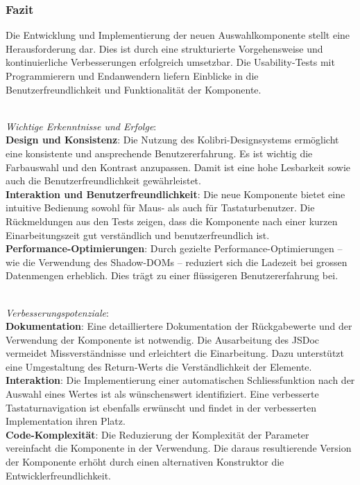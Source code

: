 % 


\subsubsection{Fazit}
\label{sec:userTestsSummery}

Die Entwicklung und Implementierung der neuen Auswahlkomponente stellt eine Herausforderung dar. 
Dies ist durch eine strukturierte Vorgehensweise und kontinuierliche Verbesserungen erfolgreich umsetzbar. 
Die Usability-Tests mit Programmierern und Endanwendern liefern Einblicke in die Benutzerfreundlichkeit und Funktionalität der Komponente. 

 \\
\noindent
\emph{Wichtige Erkenntnisse und Erfolge}: 
\\
\textbf{Design und Konsistenz}: 
Die Nutzung des Kolibri-Designsystems ermöglicht eine konsistente und ansprechende Benutzererfahrung. 
Es ist wichtig die Farbauswahl und den Kontrast anzupassen. 
Damit ist eine hohe Lesbarkeit sowie auch die Benutzerfreundlichkeit gewährleistet.
\\
\textbf{Interaktion und Benutzerfreundlichkeit}: 
Die neue Komponente bietet eine intuitive Bedienung sowohl für Maus- als auch für Tastaturbenutzer. 
Die Rückmeldungen aus den Tests zeigen, dass die Komponente nach einer kurzen Einarbeitungszeit gut verständlich und benutzerfreundlich ist. 
\\
\textbf{Performance-Optimierungen}: 
Durch gezielte Performance-Optimierungen – wie die Verwendung des Shadow-DOMs – reduziert sich die Ladezeit bei grossen Datenmengen erheblich. 
Dies trägt zu einer flüssigeren Benutzererfahrung bei. 

 \\
\noindent
\emph{Verbesserungspotenziale}: 
\\
\textbf{Dokumentation}: 
Eine detailliertere Dokumentation der Rückgabewerte und der Verwendung der Komponente ist notwendig. 
Die Ausarbeitung des JSDoc vermeidet Missverständnisse und erleichtert die Einarbeitung. 
Dazu unterstützt eine Umgestaltung des Return-Werts die Verständlichkeit der Elemente. 
\\
\textbf{Interaktion}: 
Die Implementierung einer automatischen Schliessfunktion nach der Auswahl eines Wertes ist als wünschenswert identifiziert. 
Eine verbesserte Tastaturnavigation ist ebenfalls erwünscht und findet in der verbesserten Implementation ihren Platz. 
\\
\textbf{Code-Komplexität}: 
Die Reduzierung der Komplexität der Parameter vereinfacht die Komponente in der Verwendung. 
Die daraus resultierende Version der Komponente erhöht durch einen alternativen Konstruktor die Entwicklerfreundlichkeit. 

